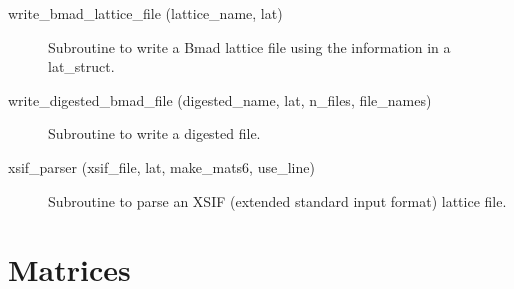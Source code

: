 \begin{description}
\item[write_bmad_lattice_file (lattice_name, lat)] \Newline 
Subroutine to write a Bmad lattice file using the information in
a lat_struct.

\item[write_digested_bmad_file (digested_name, lat, n_files, file_names)] \Newline
Subroutine to write a digested file. 

\item[xsif_parser (xsif_file, lat, make_mats6, use_line)] \Newline 
     Subroutine to parse an XSIF (extended standard input format) lattice file.

\end{description}

\section{Matrices}
\label{r:mat}

